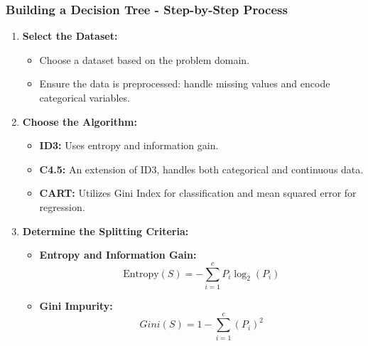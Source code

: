 \documentclass[aspectratio=169]{beamer}
\begin{document}
\begin{frame}[fragile]
    \frametitle{Building a Decision Tree - Step-by-Step Process}
    \begin{enumerate}
        \item \textbf{Select the Dataset:}
        \begin{itemize}
            \item Choose a dataset based on the problem domain.
            \item Ensure the data is preprocessed: handle missing values and encode categorical variables.
        \end{itemize}

        \item \textbf{Choose the Algorithm:}
        \begin{itemize}
            \item \textbf{ID3:} Uses entropy and information gain.
            \item \textbf{C4.5:} An extension of ID3, handles both categorical and continuous data.
            \item \textbf{CART:} Utilizes Gini Index for classification and mean squared error for regression.
        \end{itemize}

        \item \textbf{Determine the Splitting Criteria:}
        \begin{itemize}
            \item \textbf{Entropy and Information Gain:}
            \begin{equation}
                \text{Entropy}(S) = - \sum_{i=1}^{c} P_i \log_2(P_i)
            \end{equation}
            \item \textbf{Gini Impurity:}
            \begin{equation}
                Gini(S) = 1 - \sum_{i=1}^{c} (P_i)^2
            \end{equation}
        \end{itemize}
    \end{enumerate}
\end{frame}
\end{document}
